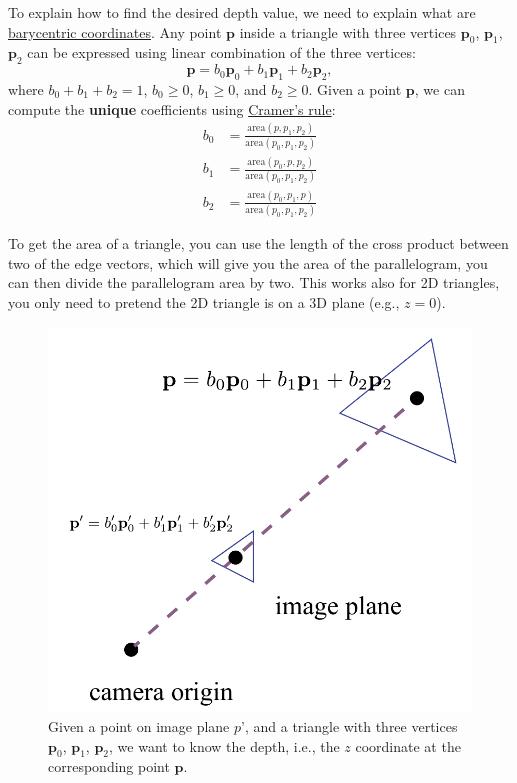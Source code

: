 To explain how to find the desired depth value, we need to explain what are \href{https://en.wikipedia.org/wiki/Barycentric_coordinate_system}{barycentric coordinates}. Any point $\mathbf{p}$ inside a triangle with three vertices $\mathbf{p}_0$, $\mathbf{p}_1$, $\mathbf{p}_2$ can be expressed using linear combination of the three vertices:
\begin{equation}
\mathbf{p} = b_0 \mathbf{p}_0 + b_1 \mathbf{p}_1 + b_2 \mathbf{p}_2,
\end{equation}
where $b_0 + b_1 + b_2 = 1$, $b_0 \geq 0$, $b_1 \geq 0$, and $b_2 \geq 0$. Given a point $\mathbf{p}$, we can compute the \textbf{unique} coefficients using \href{https://en.wikipedia.org/wiki/Cramer%27s_rule}{Cramer's rule}:
\begin{equation}
\begin{aligned}
b_0 &= \frac{\text{area}\left(p, p_1, p_2\right)}{\text{area}\left(p_0, p_1, p_2\right)} \\
b_1 &= \frac{\text{area}\left(p_0, p, p_2\right)}{\text{area}\left(p_0, p_1, p_2\right)} \\
b_2 &= \frac{\text{area}\left(p_0, p_1, p\right)}{\text{area}\left(p_0, p_1, p_2\right)}
\end{aligned}
\label{eq:barycentric_solve}
\end{equation}

To get the area of a triangle, you can use the length of the cross product between two of the edge vectors, which will give you the area of the parallelogram, you can then divide the parallelogram area by two. This works also for 2D triangles, you only need to pretend the 2D triangle is on a 3D plane (e.g., $z=0$).

\begin{figure}[h]
    \centering
    \includegraphics[width=0.5\linewidth]{imgs/perspective_interpolate.pdf}
    \caption{Given a point on image plane $p$', and a triangle with three vertices $\mathbf{p}_0$, $\mathbf{p}_1$, $\mathbf{p}_2$, we want to know the depth, i.e., the $z$ coordinate at the corresponding point $\mathbf{p}$.}
    \label{fig:perspective_interpolate}
\end{figure}

